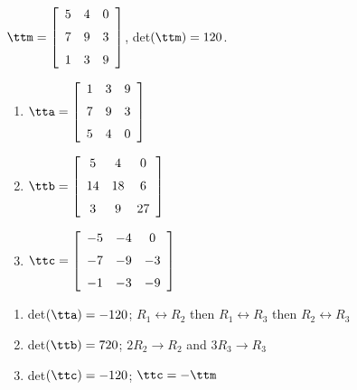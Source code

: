 {$\ttm=\left[ \begin {array}{ccc} 5&4&0\\\noalign{\medskip}7&9&3
\\\noalign{\medskip}1&3&9\end {array} \right] $,
 \quad
 det$(\ttm)=120$.
\begin{enumerate}
\item $\tta = \left[ \begin {array}{ccc} 1&3&9\\\noalign{\medskip}7&9&3
\\\noalign{\medskip}5&4&0\end {array} \right] $
\item	$\ttb = \left[ \begin {array}{ccc} 5&4&0\\\noalign{\medskip}14&18&6
\\\noalign{\medskip}3&9&27\end {array} \right]$
\item	$\ttc = \left[ \begin {array}{ccc} -5&-4&0\\\noalign{\medskip}-7&-9&-3
\\\noalign{\medskip}-1&-3&-9\end {array} \right] $
\end{enumerate}} 
{\begin{enumerate}
\item det$(\tta) = -120$; $R_1\leftrightarrow R_2$ then $R_1\leftrightarrow R_3$ then $R_2\leftrightarrow R_3$
\item det$(\ttb) = 720$; $2R_2\rightarrow R_2$ and $3R_3\rightarrow R_3$
\item det$(\ttc) = -120$; $\ttc = -\ttm$
\end{enumerate}}



  

